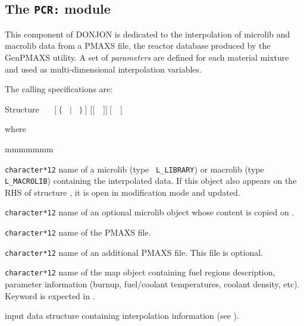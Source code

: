 \subsection{The {\tt PCR:} module}\label{sect:PCRData}

This component of DONJON is dedicated to the interpolation of {\sc microlib} and
{\sc macrolib} data from a PMAXS file, the reactor database produced by the GenPMAXS utility.\cite{GENPMAXS}
A set of {\sl parameters} are defined for each material mixture and used as multi-dimensional interpolation variables.

\vskip 0.02cm

The calling specifications are:

\begin{DataStructure}{Structure }
~\moc{:=}~~$[~\{$~ $|$ ~$\}~]$  $[[$~~$]]~[$~~$]$~\moc{::}~ \\
\end{DataStructure}

\noindent where
\begin{ListeDeDescription}{mmmmmmm}

\item[\dusa{MLIB}] {\tt character*12} name of a {\sc microlib} (type {\tt
L\_LIBRARY}) or {\sc macrolib} (type {\tt L\_MACROLIB}) containing the interpolated data. If this object also appears on the RHS of structure ,
it is open in modification mode and updated.

\item[\dusa{MLIB2}] {\tt character*12} name of an optional {\sc microlib} object whose content is copied on .

\item[\dusa{PMAX1}] {\tt character*12} name of the PMAXS file.

\item[\dusa{PMAX2}] {\tt character*12} name of an additional PMAXS file. This file is optional.

\item[\dusa{MAPFL}] {\tt character*12} name of the {\sc map} object containing fuel regions description, parameter
information (burnup, fuel/coolant temperatures, coolant density, etc). Keyword  is expected in .

\item[\dusa{PCR\_data}] input data structure containing interpolation information (see ).

\end{ListeDeDescription}

